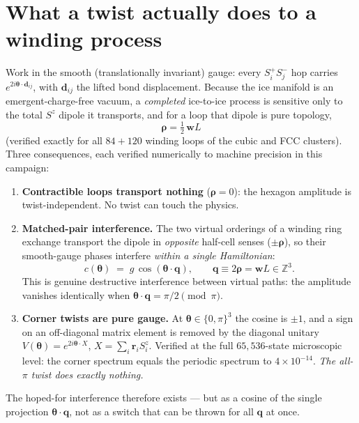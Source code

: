 \documentclass[11pt]{article}
\newcommand{\btheta}{\boldsymbol{\theta}}
\newcommand{\bq}{\mathbf{q}}
\newcommand{\bw}{\mathbf{w}}
\newcommand{\Z}{\mathbb{Z}}
\begin{document}
\section{What a twist actually does to a winding process}
\label{sec:twist}

Work in the smooth (translationally invariant) gauge: every $S^+_iS^-_j$ hop
carries $e^{2i\btheta\cdot\mathbf{d}_{ij}}$, with $\mathbf{d}_{ij}$ the lifted
bond displacement.  Because the ice manifold is an emergent-charge-free
vacuum, a \emph{completed} ice-to-ice process is sensitive only to the total
$S^z$ dipole it transports, and for a loop that dipole is pure topology,
\begin{equation}
  \boldsymbol{\rho} = \tfrac12\,\bw L
\end{equation}
(verified exactly for all $84+120$ winding loops of the cubic and FCC
clusters).  Three consequences, each verified numerically to machine
precision in this campaign:
\begin{enumerate}
\item \textbf{Contractible loops transport nothing} ($\boldsymbol{\rho}=0$):
  the hexagon amplitude is twist-independent.  No twist can touch the physics.
\item \textbf{Matched-pair interference.}  The two virtual orderings of a
  winding ring exchange transport the dipole in \emph{opposite} half-cell
  senses ($\pm\boldsymbol{\rho}$), so their smooth-gauge phases interfere
  \emph{within a single Hamiltonian}:
  \begin{equation}
    c(\btheta) \;=\; g\,\cos(\btheta\cdot\bq),
    \qquad \bq \equiv 2\boldsymbol{\rho} = \bw L \in \Z^3 .
    \label{eq:cosine}
  \end{equation}
  This is genuine destructive interference between virtual paths: the
  amplitude vanishes identically when $\btheta\cdot\bq = \pi/2 \pmod{\pi}$.
\item \textbf{Corner twists are pure gauge.}  At
  $\btheta\in\{0,\pi\}^3$ the cosine is $\pm1$, and a sign on an off-diagonal
  matrix element is removed by the diagonal unitary
  $V(\btheta)=e^{2i\btheta\cdot X}$, $X=\sum_i \mathbf{r}_i S^z_i$.  Verified
  at the full $65{,}536$-state microscopic level: the corner spectrum equals
  the periodic spectrum to $4\times10^{-14}$.  \emph{The all-$\pi$ twist does
  exactly nothing.}
\end{enumerate}
The hoped-for interference therefore exists --- but as a cosine of the single
projection $\btheta\cdot\bq$, not as a switch that can be thrown for all
$\bq$ at once.
\end{document}
